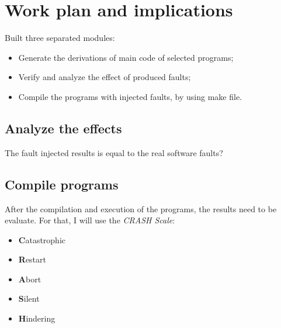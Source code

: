 \newpage
\section{Work plan and implications}

Built three separated modules:

\begin{itemize}
	\item Generate the derivations of main code of selected programs;
	\item Verify and analyze the effect of produced faults;
	\item Compile the programs with injected faults, by using make file.
\end{itemize}

\subsection{Analyze the effects}

The fault injected results is equal to the real software faults?

\subsection{Compile programs}


After the compilation and execution of the programs, the results need to be evaluate. For that, I will use the \textit{CRASH Scale}\cite{koopman1997comparing}:

\begin{itemize}
	\item \textbf{C}atastrophic
	\item \textbf{R}estart
	\item \textbf{A}bort
	\item \textbf{S}ilent
	\item \textbf{H}indering
\end{itemize}